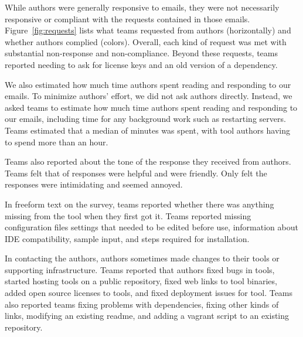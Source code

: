 \documentclass{sig-alternate-05-2015}
\begin{document}
While authors were generally responsive to emails,
they were not necessarily responsive or compliant 
with the requests contained in those emails.
Figure~\ref{fig:requests} lists what teams requested from authors
(horizontally) and whether authors complied (colors).
Overall, each kind of request was met with substantial non-response and
non-compliance.
Beyond these requests, teams reported needing to ask for 
license keys and
an old version of a dependency.



We also estimated how much
time authors spent reading and responding to our emails.
To minimize authors' effort, we did not ask authors directly.
Instead, we asked teams to estimate how much time authors spent 
reading and responding to our emails, including time for 
any background work such as restarting servers.
Teams estimated that a median of \durationAuthorResponse minutes 
was spent, with \durationAuthorResponseCountHigh tool authors having
to spend more than an hour.

Teams also reported about the tone of the response they received from 
authors.
Teams felt that \emailsHelpful of responses were helpful and
\emailsFriendly were friendly.
Only \emailsIntimidating felt the responses were intimidating
and \emailsAnnoyed seemed annoyed.

In freeform text on the survey, teams reported whether 
there was anything missing from the tool when they first
got it.
Teams reported missing configuration files
settings that needed to be edited before use, 
information about IDE compatibility,
sample input,
and steps required for installation.                                                                                                               

In contacting the authors, authors sometimes made
changes to their tools or supporting infrastructure.
Teams reported that authors fixed bugs in \contactFixBug tools,
started hosting \contactHosted tools on a public repository,
fixed web links to \contactFixLink tool binaries,
added open source licenses to \contactOSSed tools,
and fixed deployment issues for \contactFixDepl tool.
Teams also reported teams fixing problems with dependencies,
fixing other kinds of links, 
modifying an existing readme,
and adding a vagrant script to an existing repository.
\end{document}
